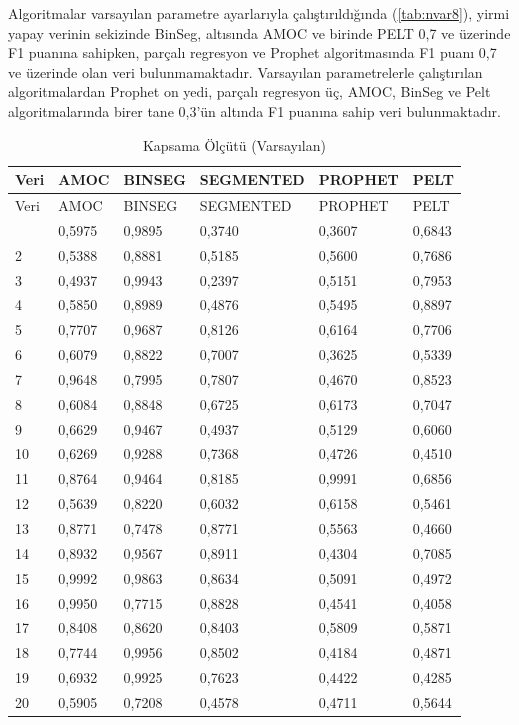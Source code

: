 \documentclass[12pt,twoside]{deuthesis}
\begin{document}
Algoritmalar varsayılan parametre ayarlarıyla çalıştırıldığında (\ref{tab:nvar8}), yirmi yapay verinin sekizinde BinSeg, altısında AMOC ve birinde PELT 0,7 ve üzerinde F1 puanına sahipken, parçalı regresyon ve Prophet algoritmasında F1 puanı 0,7 ve üzerinde olan veri bulunmamaktadır.
Varsayılan parametrelerle çalıştırılan algoritmalardan Prophet on yedi, parçalı regresyon üç, AMOC, BinSeg ve Pelt algoritmalarında birer tane 0,3'ün altında F1 puanına sahip veri bulunmaktadır.

\begin{longtable}[]{@{}llllll@{}}
\caption{\label{tab:nvar9} Kapsama Ölçütü (Varsayılan)}\tabularnewline
\toprule\noalign{}
Veri & AMOC & BINSEG & SEGMENTED & PROPHET & PELT \\
\midrule\noalign{}
\endfirsthead
\toprule\noalign{}
Veri & AMOC & BINSEG & SEGMENTED & PROPHET & PELT \\
\midrule\noalign{}
\endhead
\bottomrule\noalign{}
\endlastfoot
1 & 0,5975 & 0,9895 & 0,3740 & 0,3607 & 0,6843 \\
2 & 0,5388 & 0,8881 & 0,5185 & 0,5600 & 0,7686 \\
3 & 0,4937 & 0,9943 & 0,2397 & 0,5151 & 0,7953 \\
4 & 0,5850 & 0,8989 & 0,4876 & 0,5495 & 0,8897 \\
5 & 0,7707 & 0,9687 & 0,8126 & 0,6164 & 0,7706 \\
6 & 0,6079 & 0,8822 & 0,7007 & 0,3625 & 0,5339 \\
7 & 0,9648 & 0,7995 & 0,7807 & 0,4670 & 0,8523 \\
8 & 0,6084 & 0,8848 & 0,6725 & 0,6173 & 0,7047 \\
9 & 0,6629 & 0,9467 & 0,4937 & 0,5129 & 0,6060 \\
10 & 0,6269 & 0,9288 & 0,7368 & 0,4726 & 0,4510 \\
11 & 0,8764 & 0,9464 & 0,8185 & 0,9991 & 0,6856 \\
12 & 0,5639 & 0,8220 & 0,6032 & 0,6158 & 0,5461 \\
13 & 0,8771 & 0,7478 & 0,8771 & 0,5563 & 0,4660 \\
14 & 0,8932 & 0,9567 & 0,8911 & 0,4304 & 0,7085 \\
15 & 0,9992 & 0,9863 & 0,8634 & 0,5091 & 0,4972 \\
16 & 0,9950 & 0,7715 & 0,8828 & 0,4541 & 0,4058 \\
17 & 0,8408 & 0,8620 & 0,8403 & 0,5809 & 0,5871 \\
18 & 0,7744 & 0,9956 & 0,8502 & 0,4184 & 0,4871 \\
19 & 0,6932 & 0,9925 & 0,7623 & 0,4422 & 0,4285 \\
20 & 0,5905 & 0,7208 & 0,4578 & 0,4711 & 0,5644 \\
\end{longtable}
\end{document}
